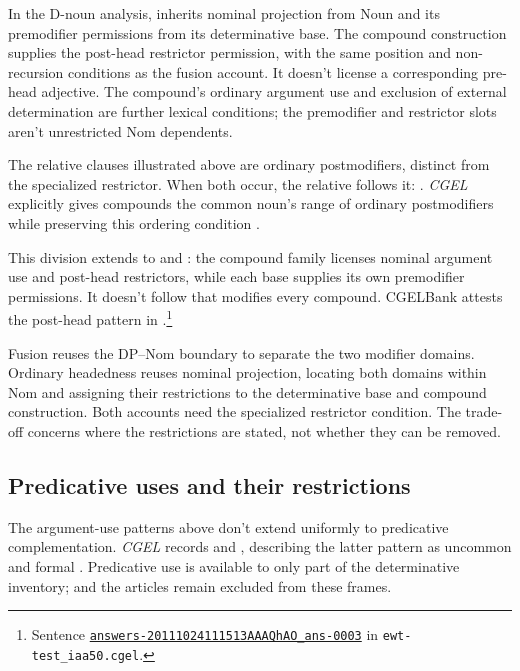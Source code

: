 \documentclass[12pt]{article}
\begin{document}
In the D-noun analysis,  inherits nominal projection from Noun and its premodifier permissions from its determinative base. The compound construction supplies the post-head restrictor permission, with the same position and non-recursion conditions as the fusion account. It doesn't license a corresponding pre-head adjective. The compound's ordinary argument use and exclusion of external determination are further lexical conditions; the premodifier and restrictor slots aren't unrestricted Nom dependents.

The relative clauses illustrated above are ordinary postmodifiers, distinct from the specialized restrictor. When both occur, the relative follows it: . \textit{CGEL} explicitly gives compounds the common noun's range of ordinary postmodifiers while preserving this ordering condition \citep[423]{huddleston2002}.

This division extends to  and : the compound family licenses nominal argument use and post-head restrictors, while each base supplies its own premodifier permissions. It doesn't follow that  modifies every compound. CGELBank attests the post-head pattern in .\footnote{Sentence \href{https://github.com/nert-nlp/cgel/blob/d0a2c2d8c522b23d5aa879fc9cb94948f4285b2c/datasets/ewt-test_iaa50.cgel\#L179-L181}{\nolinkurl{answers-20111024111513AAAQhAO_ans-0003}} in \nolinkurl{ewt-test_iaa50.cgel}.}

Fusion reuses the DP--Nom boundary to separate the two modifier domains. Ordinary headedness reuses nominal projection, locating both domains within Nom and assigning their restrictions to the determinative base and compound construction. Both accounts need the specialized restrictor condition. The trade-off concerns where the restrictions are stated, not whether they can be removed.

\subsection{Predicative uses and their restrictions}\label{sec:predication}

The argument-use patterns above don't extend uniformly to predicative complementation. \textit{CGEL} records  and , describing the latter pattern as uncommon and formal \citep[392, 395--396]{huddleston2002}. Predicative use is available to only part of the determinative inventory;  and the articles remain excluded from these frames.
\end{document}
